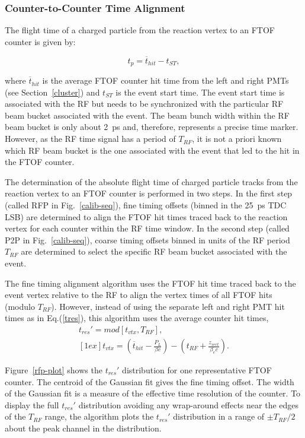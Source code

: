 \documentclass[3p,times,twocolumn]{elsarticle}
\begin{document}
\subsubsection{Counter-to-Counter Time Alignment}
\label{sec-talign}

The flight time of a charged particle from the reaction vertex to an FTOF counter is given by:

\begin{equation}
t_p = \overline{t}_{hit} - t_{ST},
\end{equation}

\noindent
where $\overline{t}_{hit}$ is the average FTOF counter hit time from the left and right PMTs (see
Section~\ref{cluster}) and $t_{ST}$ is the event start time. The event start time is associated with the
RF but needs to be synchronized with the particular RF beam bucket associated with the event. The
beam bunch width within the RF beam bucket is only about 2~ps and, therefore, represents a precise time
marker. However, as the RF time signal has a period of $T_{RF}$, it is not a priori known which RF beam
bucket is the one associated with the event that led to the hit in the FTOF counter.

The determination of the absolute flight time of charged particle tracks from the reaction vertex to an
FTOF counter is performed in two steps. In the first step (called RFP in Fig.~\ref{calib-seq}), fine timing
offsets (binned in the 25~ps TDC LSB) are determined to align the FTOF hit times traced back to the
reaction vertex for each counter within the RF time window. In the second step (called P2P in
Fig.~\ref{calib-seq}), coarse timing offsets binned in units of the RF period $T_{RF}$ are determined to
select the specific RF beam bucket associated with the event.

The fine timing alignment algorithm uses the FTOF hit time traced back to the event vertex relative
to the RF to align the vertex times of all FTOF hits (modulo $T_{RF}$). However, instead of using the
separate left and right PMT hit times as in Eq.(\ref{tres}), this algorithm uses the average counter
hit times, 
\begin{eqnarray}
t_{res}' = mod \left[ t_{vtx}, T_{RF} \right], ~~~~~\\ [1ex]
t_{vtx} = \left(\overline{t}_{hit} - \frac{P_L}{\beta c} \right) - 
\left(t_{RF} + \frac{z_{vert}}{\beta_e c} \right). \nonumber
\end{eqnarray}

Figure~\ref{rfp-plot} shows the $t_{res}'$ distribution for one representative FTOF counter. The
centroid of the Gaussian fit gives the fine timing offset. The width of the Gaussian fit is a measure
of the effective time resolution of the counter. To display the full $t_{res}'$ distribution avoiding any
wrap-around effects near the edges of the $T_{RF}$ range, the algorithm plots the $t_{res}'$ distribution
in a range of $\pm T_{RF}/2$ about the peak channel in the distribution.
\end{document}
